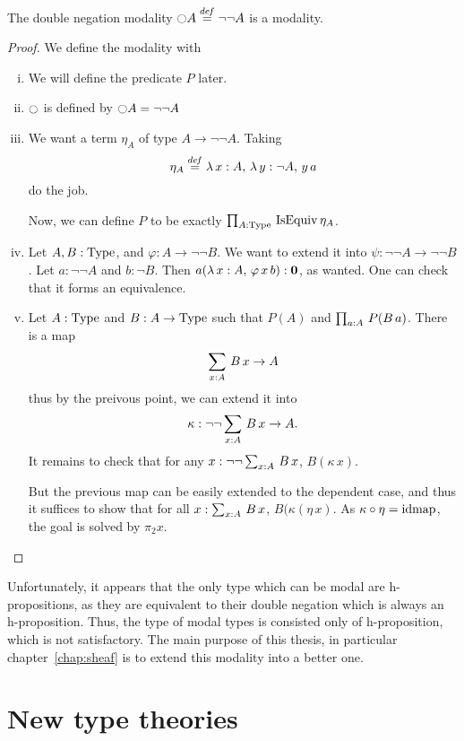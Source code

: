 \begin{prop}
  The double negation modality $\ocircle A \overset{de\hspace{-0.2ex}f}{=} \lnot\lnot A$ is a
  modality.  
\end{prop}
\begin{proof}
  We define the modality with
  \begin{enumerate}[(i)]
  \item We will define the predicate $P$ later.
  \item $\ocircle$ is defined by $\ocircle A = \lnot\lnot A$
  \item We want a term $\eta_A$ of type $A \to \lnot \lnot A$.
    Taking 
    \[ \eta_A\overset{de\hspace{-0.2ex}f}{=} \lambda \, x:A,\,\lambda\, y:\lnot A,\, y\, a\] 
    do the job.
    
    Now, we can define $P$ to be exactly $\prod_{A:\operatorname{Type}}\, \operatorname{IsEquiv}
      \eta_A$.
  \item Let $A,B:\operatorname{Type}$, and $\varphi : A \to \lnot\lnot B$. We
    want to extend it into $\psi : \lnot\lnot A \to \lnot\lnot B$. Let
    $a:\lnot\lnot A$ and $b:\lnot B$.
    Then $a(\lambda\, x:A,\, \varphi\, x \, b) : \mathbf{0}$, as
    wanted. One can check that it forms an equivalence.
  \item Let $A:\operatorname{Type}$ and $B:A\to\operatorname{Type}$ such that $P(A)$ and $\prod_{a:A}\, P(B\, a)$. There is a map
    \[\sum_{x:A}\, B\, x \to A \]
    thus by the preivous point, we can extend it into 
    \[\kappa:\lnot\lnot\sum_{x:A}\, B\, x \to A.\]
    It remains to check that for any $x:\lnot\lnot\sum_{x:A}\, B\, x$,
    $B(\kappa\, x)$.

    But the previous map can be easily extended to the dependent case,
    and thus it suffices to show that for all $x:\sum_{x:A}\, B\, x$,
    $B(\kappa(\eta\, x)$. As $\kappa \circ \eta = \operatorname{\mathrm{idmap}}$, the goal is
    solved by $\pi_2 x$.
  \end{enumerate}
\end{proof}

Unfortunately, it appears that the only type which can be modal are
h-propositions, as they are equivalent to their double negation which
is always an h-proposition. Thus, the type of modal types is consisted
only of h-proposition, which is not satisfactory. The main purpose of this
thesis, in particular chapter~\ref{chap:sheaf} is to extend this
modality into a better one.

\section{New type theories}
\label{sec:new-type-theories}

